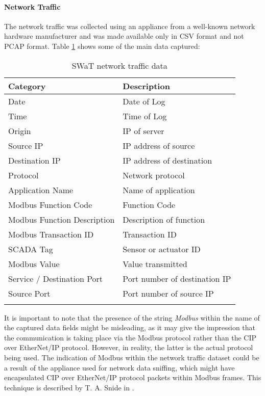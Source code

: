 \paragraph{Network Traffic}
\label{par:5_2015_net_dataset}
The network traffic was collected using an appliance from a well-known network hardware manufacturer and was made available only in CSV format and not PCAP format. Table \ref{table:5_swat_network_traffic_data} shows some of the main data captured:

\vfill
\pagebreak

{\small
\begin{longtable}[c]{p{} p{}}
	\hline
	\textbf{Category} & \textbf{Description} \\ [0.5ex] 
	\hline
	Date & Date of Log \\
	\hline 
	Time & Time of Log \\
	\hline
	Origin & IP of server \\
	\hline 
	Source IP & IP address of source \\ 
	\hline
	Destination IP & IP address of destination \\ 
	\hline
	Protocol & Network protocol \\ 
	\hline
	Application Name & Name of application \\ 
	\hline
	Modbus Function Code & Function Code \\ 
	\hline
	Modbus Function Description & Description of function \\ 
	\hline
	Modbus Transaction ID & Transaction ID \\ 
	\hline
	SCADA Tag & Sensor or actuator ID \\ 
	\hline
	Modbus Value & Value transmitted \\ 
	\hline
	Service / Destination Port & Port number of destination IP \\ 
	\hline
	Source Port & Port number of source IP \\ 
	\hline
	
	\caption{SWaT network traffic data}
	\label{table:5_swat_network_traffic_data}
\end{longtable} }

It is important to note that the presence of the string \textit{Modbus} within the name of the captured data fields might be misleading, as it may give the impression that the communication is taking place via the Modbus protocol rather than the CIP over EtherNet/IP protocol. However, in reality, the latter is the actual protocol being used. The indication of Modbus within the network traffic dataset could be a result of the appliance used for network data sniffing, which might have encapsulated CIP over EtherNet/IP protocol packets within Modbus frames. This technique is described by T. A. Snide in \cite{cip_in_modbus}.

